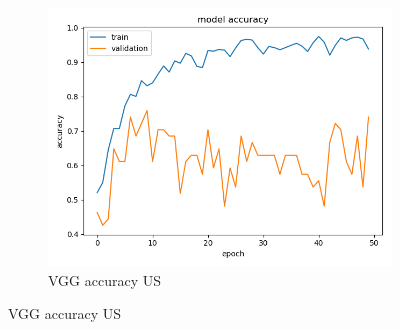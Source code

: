 \begin{figure}
\begin{subfigure}[b]{.3\linewidth}
\includegraphics[width=\linewidth]{Figs/resnet_us_acc.jpg}
\caption{VGG accuracy US}\label{fig:tiger}
\end{subfigure}


\end{figure}
